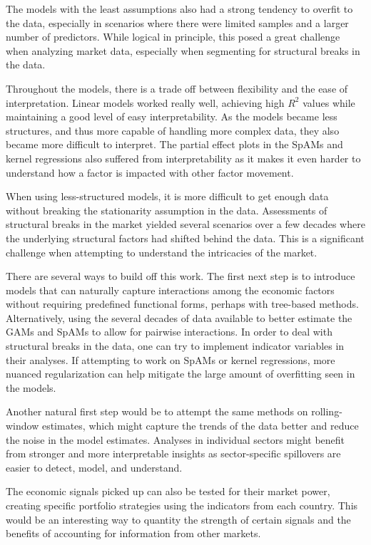 The models with the least assumptions also had a strong tendency to overfit to the data, especially in scenarios where there were limited samples and a larger number of predictors. While logical in principle, this posed a great challenge when analyzing market data, especially when segmenting for structural breaks in the data.

Throughout the models, there is a trade off between flexibility and the ease of interpretation. Linear models worked really well, achieving high $R^2$ values while maintaining a good level of easy interpretability. As the models became less structures, and thus more capable of handling more complex data, they also became more difficult to interpret. The partial effect plots in the SpAMs and kernel regressions also suffered from interpretability as it makes it even harder to understand how a factor is impacted with other factor movement.

When using less-structured models, it is more difficult to get enough data without breaking the stationarity assumption in the data. Assessments of structural breaks in the market yielded several scenarios over a few decades where the underlying structural factors had shifted behind the data. This is a significant challenge when attempting to understand the intricacies of the market.

There are several ways to build off this work. The first next step is to introduce models that can naturally capture interactions among the economic factors without requiring predefined functional forms, perhaps with tree-based methods. Alternatively, using the several decades of data available to better estimate the GAMs and SpAMs to allow for pairwise interactions. In order to deal with structural breaks in the data, one can try to implement indicator variables in their analyses. If attempting to work on SpAMs or kernel regressions, more nuanced regularization can help mitigate the large amount of overfitting seen in the models.

Another natural first step would be to attempt the same methods on rolling-window estimates, which might capture the trends of the data better and reduce the noise in the model estimates. Analyses in individual sectors might benefit from stronger and more interpretable insights as sector-specific spillovers are easier to detect, model, and understand.

The economic signals picked up can also be tested for their market power, creating specific portfolio strategies using the indicators from each country. This would be an interesting way to quantity the strength of certain signals and the benefits of accounting for information from other markets.

